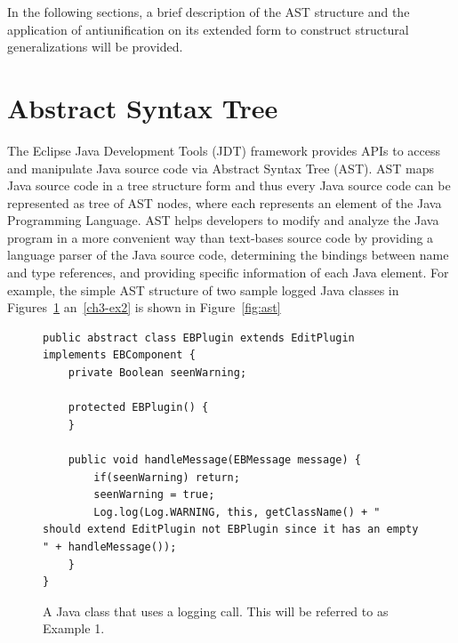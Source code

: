 In the following sections, a brief description of the AST structure and the application of antiunification on its extended form to construct structural generalizations will be provided.

\section{Abstract Syntax Tree}   \label{AST}

The Eclipse Java Development Tools (JDT) framework provides APIs to access and manipulate Java source code via Abstract Syntax Tree (AST). AST maps Java source code in a tree structure form and thus every Java source code can be represented as tree of AST nodes, where each represents an element of the Java Programming Language. AST helps developers to modify and analyze the Java program in a more convenient way than text-bases source code by providing a language parser of the Java source code, determining the bindings between name and type references, and providing specific information of each Java element. For example, the simple AST structure of two sample logged Java classes in Figures~\ref{ch3-ex1} an~\ref{ch3-ex2} is shown in Figure~\ref{fig:ast}


\begin{figure}[H]
\def\baselinestretch{1}
\begin{lstlisting}
public abstract class EBPlugin extends EditPlugin implements EBComponent {
    private Boolean seenWarning;
  
    protected EBPlugin() {
    }

    public void handleMessage(EBMessage message) {
        if(seenWarning) return;
        seenWarning = true;
        Log.log(Log.WARNING, this, getClassName() + " should extend EditPlugin not EBPlugin since it has an empty " + handleMessage());
    }
}
\end{lstlisting}
\caption{A Java class that uses a logging call. This will be referred to as Example 1.\label{ch3-ex1}}
\end{figure}


